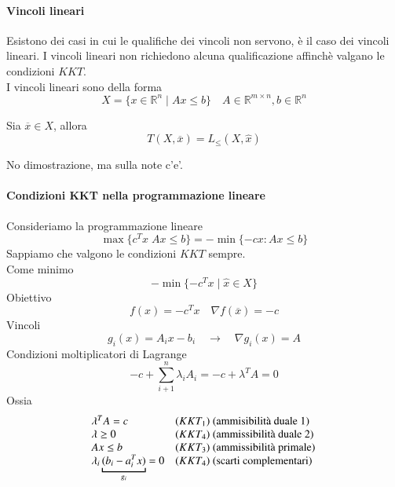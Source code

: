 \paragraph{Vincoli lineari}
Esistono dei casi in cui le qualifiche dei vincoli non servono, \`e
il caso dei vincoli lineari.
I vincoli lineari non richiedono alcuna qualificazione affinch\`e
valgano le condizioni $KKT$. \\
I vincoli lineari sono della forma
$$ X = \{ x \in \mathbb{R}^{n} \; | \; Ax \leq b \} \quad
A \in \mathbb{R}^{m \times n}, b \in \mathbb{R}^{n} $$

\begin{proposition}
Sia $\overline{x} \in X$, allora 
$$T(X, \overline{x}) =L_{\leq} (X, \hat{x})$$
\end{proposition}
\begin{notes}
No dimostrazione, ma sulla note c'e'.
\end{notes}
\paragraph{Condizioni KKT nella programmazione lineare}
Consideriamo la programmazione lineare
$$ \max \{c^{T}x \;  Ax \leq b \}  = - \min\{-cx : Ax \leq b \}$$
Sappiamo che valgono le condizioni $KKT$ sempre. \\
Come minimo
$$  -\min \{ - c^{T}x \; | \; \hat{x} \in X \} $$
Obiettivo
$$ f(x)  = -c^{T}x \quad \nabla f(\overline{x}) = - c $$
Vincoli
$$ g_i(x) = A_i x - b_i  \quad \rightarrow \quad \nabla g_i(x) = A$$
Condizioni moltiplicatori di Lagrange 
$$ -c + \displaystyle \sum_{i+1}^{n} \lambda_i A_i
= -c + \lambda^{T} A = 0
$$
Ossia
$$
\begin{array}{ll}
   \lambda^{T}A = c  & (KKT_1) \text{ (ammisibilit\`a duale 1) } \\
  \lambda \geq 0  & (KKT_4) \text{ (ammissibilit\`a duale 2) } \\
   Ax \leq b & \text (KKT_3) \text{ (ammissibilit\`a primale)} \\
\lambda_i \underbracket{(b_i - a_i^{T}x)}_{g_i} = 0 &
 (KKT_4) \text{ (scarti complementari) } 
\end{array}
$$

